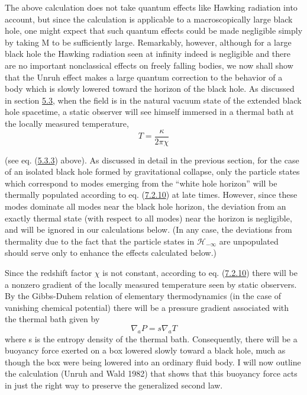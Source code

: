 \documentclass[11pt,a4paper]{article}
\begin{document}
\hypertarget{source-181}{}

The above calculation does not take quantum effects like Hawking radiation into account, but since the calculation is applicable to a macroscopically large black hole, one might expect that such quantum effects could be made negligible simply by taking M to be sufficiently large. Remarkably, however, although for a large black hole the Hawking radiation seen at infinity indeed is negligible and there are no important nonclassical effects on freely falling bodies, we now shall show that the Unruh effect makes a large quantum correction to the behavior of a body which is slowly lowered toward the horizon of the black hole. As discussed in section \hyperlink{sec:5.3}{5.3}, when the field is in the natural vacuum state of the extended black hole spacetime, a static observer will see himself immersed in a thermal bath at the locally measured temperature,
\begin{equation*}
T=\frac{\kappa}{2\pi\chi} \tag{7.2.10}\label{eq:7.2.10}
\end{equation*}

(see eq. (\hyperref[eq:5.3.3]{5.3.3}) above). As discussed in detail in the previous section, for the case of an isolated black hole formed by gravitational collapse, only the particle states which correspond to modes emerging from the ``white hole horizon'' will be thermally populated according to eq. (\hyperref[eq:7.2.10]{7.2.10}) at late times. However, since these modes dominate all modes near the black hole horizon, the deviation from an exactly thermal state (with respect to all modes) near the horizon is negligible, and will be ignored in our calculations below. (In any case, the deviations from thermality due to the fact that the particle states in \(\mathcal{H}_{-\infty}\) are unpopulated should serve only to enhance the effects calculated below.)

Since the redshift factor \(\chi\) is not constant, according to eq. (\hyperref[eq:7.2.10]{7.2.10}) there will be a nonzero gradient of the locally measured temperature seen by static observers. By the Gibbs-Duhem relation of elementary thermodynamics (in the case of vanishing chemical potential) there will be a pressure gradient associated with the thermal bath given by
\begin{equation*}
\nabla_a P = s \nabla_a T \tag{7.2.11}\label{eq:7.2.11}
\end{equation*}
where s is the entropy density of the thermal bath. Consequently, there will be a buoyancy force exerted on a box lowered slowly toward a black hole, much as though the box were being lowered into \hypertarget{source-182}{} an ordinary fluid body. I will now outline the calculation (Unruh and Wald 1982) that shows that this buoyancy force acts in just the right way to preserve the generalized second law.
\end{document}
